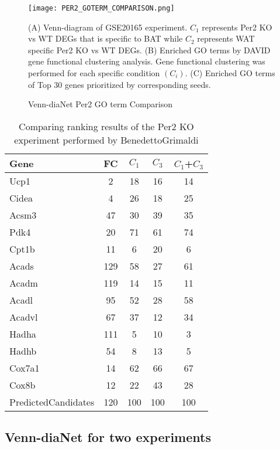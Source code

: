 \documentclass[oneside,phd]{snuthesis}
\begin{document}
\begin{figure*}
\begin{center}
\texttt{[image: PER2\_GOTERM\_COMPARISON.png]}
\end{center}
\caption{Venn-diaNet Per2 GO term Comparison}
\scriptsize{(A) Venn-diagram of GSE20165 experiment. $C_1$ represents Per2 KO vs WT DEGs that is specific to BAT while $C_2$ represents WAT specific Per2 KO vs WT DEGs.
(B) Enriched GO terms by DAVID gene functional clustering analysis. Gene functional clustering was performed for each specific condition $(C_i)$.
(C) Enriched GO terms of Top 30 genes prioritized by corresponding seeds.}
\label{result_figure_per2}
\end{figure*}
\begin{table}[]
\centering
\begin{tabular}{l|| c c c c }
\hline
Gene & FC  & $C_1$  & $C_3$  & $C_1$+$C_3$ \\ \hline
Ucp1 & 2   & 18  & 16  & 14    \\
Cidea  & 4   & 26  & 18  & 25    \\
Acsm3  & 47  & 30  & 39  & 35    \\
Pdk4   & 20  & 71  & 61  & 74    \\
Cpt1b   & 11  & 6   & 20  & 6     \\
Acads    & 129 & 58  & 27  & 61    \\
Acadm    & 119 & 14  & 15  & 11    \\
Acadl    & 95  & 52  & 28  & 58    \\
Acadvl    & 67  & 37  & 12  & 34    \\
Hadha   & 111 & 5   & 10  & 3     \\
Hadhb    & 54  & 8   & 13  & 5     \\
Cox7a1  & 14  & 62  & 66  & 67    \\
Cox8b   & 12  & 22  & 43  & 28    \\ \hline
PredictedCandidates & 120 & 100 & 100 & 100  \\ \hline
\end{tabular}
\caption{Comparing ranking results of the Per2 KO experiment performed by BenedettoGrimaldi}
\label{venndianet_table1}
\end{table}

\subsection{Venn-diaNet for two experiments}
\end{document}
